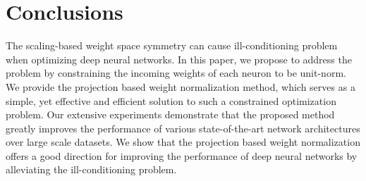 \documentclass[twocolumn]{article}
\begin{document}
\section{Conclusions}
The scaling-based weight space symmetry can cause ill-conditioning problem when optimizing deep neural networks. In this paper, we propose to address the problem by constraining the incoming weights of each neuron to be unit-norm. We provide the projection based weight normalization method, which serves as a simple, yet effective and efficient solution to such a constrained optimization problem. Our extensive experiments demonstrate that the proposed method greatly improves the performance of various state-of-the-art network architectures over large scale datasets. We show that the projection based weight normalization offers a good direction for improving the performance of deep neural networks by alleviating the ill-conditioning problem.




\end{document}
